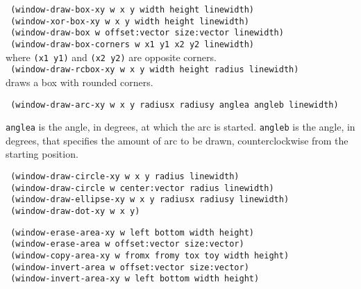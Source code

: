 \vspace{0.1in}
{\tt \hspace*{0.5in} (window-draw-box-xy w x y width height linewidth)} \\
{\tt \hspace*{0.5in} (window-xor-box-xy w x y width height linewidth)} \\
{\tt \hspace*{0.5in} (window-draw-box w offset:vector size:vector linewidth)} \\
{\tt \hspace*{0.5in} (window-draw-box-corners w x1 y1 x2 y2 linewidth)} \\
 \hspace*{1.0in} where {\tt (x1 y1)} and {\tt (x2 y2)} are opposite corners. \\
{\tt \hspace*{0.5in} (window-draw-rcbox-xy w x y width height radius linewidth)} \\
 \hspace*{1.0in} draws a box with rounded corners.

{\tt \hspace*{0.5in} (window-draw-arc-xy w x y radiusx radiusy anglea angleb linewidth)}

\vspace{-0.1in}
{\tt anglea} is the angle, in degrees, at which the arc is started.
{\tt angleb} is the angle, in degrees, that specifies the amount of arc
to be drawn, counterclockwise from the starting position.

\vspace{0.1in}
{\tt \hspace*{0.5in} (window-draw-circle-xy w x y radius linewidth)} \\
{\tt \hspace*{0.5in} (window-draw-circle w center:vector radius linewidth)} \\
{\tt \hspace*{0.5in} (window-draw-ellipse-xy w x y radiusx radiusy linewidth)} \\
{\tt \hspace*{0.5in} (window-draw-dot-xy w x y)}

\vspace{0.1in}
{\tt \hspace*{0.5in} (window-erase-area-xy w left bottom width height)} \\
{\tt \hspace*{0.5in} (window-erase-area w offset:vector size:vector)} \\
{\tt \hspace*{0.5in} (window-copy-area-xy w fromx fromy	tox toy width height)} \\
{\tt \hspace*{0.5in} (window-invert-area w offset:vector size:vector)} \\
{\tt \hspace*{0.5in} (window-invert-area-xy w left bottom width height)}

